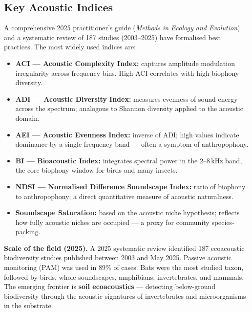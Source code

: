 \documentclass[12pt, a4paper]{article}
\begin{document}
\subsection{Key Acoustic Indices}

A comprehensive 2025 practitioner's guide (\textit{Methods in Ecology and Evolution}) and a
systematic review of 187 studies (2003--2025) have formalised best practices. The most widely
used indices are:

\begin{itemize}[itemsep=4pt]
  \item \textbf{ACI --- Acoustic Complexity Index:} captures amplitude modulation irregularity
        across frequency bins. High ACI correlates with high biophony diversity.

  \item \textbf{ADI --- Acoustic Diversity Index:} measures evenness of sound energy across
        the spectrum; analogous to Shannon diversity applied to the acoustic domain.

  \item \textbf{AEI --- Acoustic Evenness Index:} inverse of ADI; high values indicate
        dominance by a single frequency band --- often a symptom of anthropophony.

  \item \textbf{BI --- Bioacoustic Index:} integrates spectral power in the 2--8\,kHz band,
        the core biophony window for birds and many insects.

  \item \textbf{NDSI --- Normalised Difference Soundscape Index:} ratio of biophony to
        anthropophony; a direct quantitative measure of acoustic naturalness.

  \item \textbf{Soundscape Saturation:} based on the acoustic niche hypothesis; reflects how
        fully acoustic niches are occupied --- a proxy for community species-packing.
\end{itemize}

\begin{bluebox}
\textbf{Scale of the field (2025).} A 2025 systematic review identified 187 ecoacoustic
biodiversity studies published between 2003 and May 2025. Passive acoustic monitoring (PAM)
was used in 89\% of cases. Bats were the most studied taxon, followed by birds, whole
soundscapes, amphibians, invertebrates, and mammals. The emerging frontier is
\textbf{soil ecoacoustics} --- detecting below-ground biodiversity through the acoustic
signatures of invertebrates and microorganisms in the substrate.
\end{bluebox}
\end{document}
